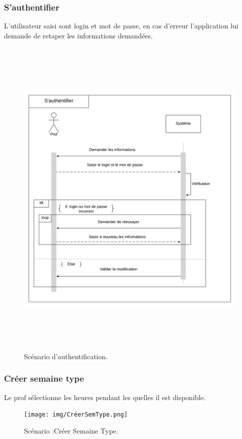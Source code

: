\subsubsection*{S'authentifier}
L'utilisateur saisi sont login et mot de passe, en cas d'erreur l'application lui demande de retaper les informations demandées.
 \begin{figure}[!htb]
      \centering
        \includegraphics[width=15cm,height=16cm]{img/S'authentifier.png}
        \caption{Scénario d'authentification. }
    \end{figure}
    
\newpage

\subsubsection*{Créer semaine type}
Le prof sélectionne les heures pendant les quelles il est disponible.
 \begin{figure}[!htb]
      \centering
        \texttt{[image: img/CréerSemType.png]}
        \caption{Scénario :Créer Semaine Type. }
    \end{figure}
\newpage
